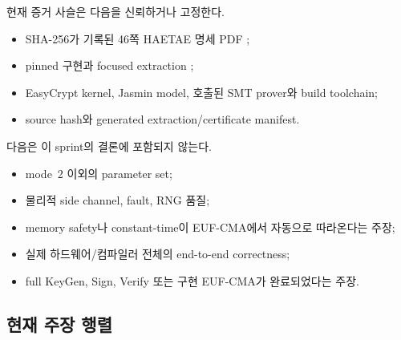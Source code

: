 현재 증거 사슬은 다음을 신뢰하거나 고정한다.

\begin{itemize}
  \item SHA-256가 기록된 46쪽 HAETAE 명세 PDF \cite{haetae-spec};
  \item pinned  구현과 focused extraction
        \cite{pinned-jasmin};
  \item EasyCrypt kernel, Jasmin model, 호출된 SMT prover와 build toolchain;
  \item source hash와 generated extraction/certificate manifest.
\end{itemize}

다음은 이 sprint의 결론에 포함되지 않는다.

\begin{itemize}
  \item mode~2 이외의 parameter set;
  \item 물리적 side channel, fault, RNG 품질;
  \item memory safety나 constant-time이 EUF-CMA에서 자동으로 따라온다는 주장;
  \item 실제 하드웨어/컴파일러 전체의 end-to-end correctness;
  \item full KeyGen, Sign, Verify 또는 구현 EUF-CMA가 완료되었다는 주장.
\end{itemize}

\subsection{현재 주장 행렬}

